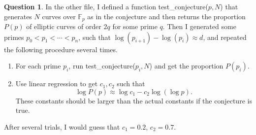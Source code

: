 \documentclass{article}
\newcommand{\F}{\mathbb{F}}
\theoremstyle{definition}
\newtheorem{question}{Question}[section]
\begin{document}
\begin{question}
    In the other file, I defined a function \textsf{test\_conjecture}($p, N$)
    that generates $N$ curves over $\F_p$ as in the conjecture and then returns the proportion $P(p)$ of elliptic curves of order $2q$ for some prime $q$.
    Then I generated some primes $p_0 < p_1 < \cdots < p_n$,
    such that $\log(p_{i+1}) - \log(p_i) \approx d$, and repeated the following procedure several times.
    \begin{enumerate}[(1)]
        \item For each prime $p_i$, run \textsf{test\_conjecture}($p_i, N$) and get the proportion $P(p_i)$.
        \item Use linear regression to get $c_1, c_2$ such that \[\log P(p)\approx \log c_1 - c_2\log(\log p).\]
        These constants should be larger than the actual constants if the conjecture is true.
    \end{enumerate}
    After several trials, I would guess that $c_1 = 0.2$, $c_2 = 0.7$.
\end{question}
\end{document}
